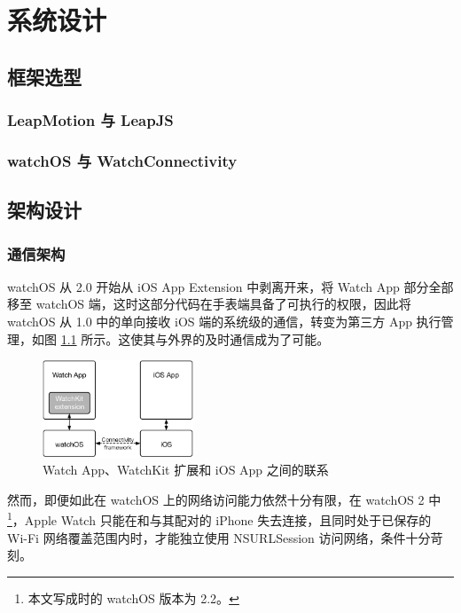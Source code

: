 \chapter{系统设计}

\section{框架选型}

\subsection{LeapMotion 与 LeapJS}

\subsection{watchOS 与 WatchConnectivity}


\section{架构设计}
\label{sec:架构设计}

\subsection{通信架构}
\label{sub:通信架构}

watchOS 从 2.0 开始从 iOS App Extension 中剥离开来，将 Watch App 部分全部移至 watchOS 端，这时这部分代码在手表端具备了可执行的权限，因此将 watchOS 从 1.0 中的单向接收 iOS 端的系统级的通信，转变为第三方 App 执行管理\cite{WatchGuide:2016}，如图 \ref{fig:watch-phone} 所示。这使其与外界的及时通信成为了可能。

\begin{figure}[H]
    \centering
    \includegraphics[width=0.4\textwidth]{figures/watch-phone}
    \caption{\kaishu Watch App、WatchKit 扩展和 iOS App 之间的联系}
    \label{fig:watch-phone}
\end{figure}

然而，即便如此在 watchOS 上的网络访问能力依然十分有限，在 watchOS 2 中\footnote{本文写成时的 watchOS 版本为 2.2。}，Apple Watch 只能在和与其配对的 iPhone 失去连接，且同时处于已保存的 Wi-Fi 网络覆盖范围内时，才能独立使用 NSURLSession 访问网络，条件十分苛刻。

